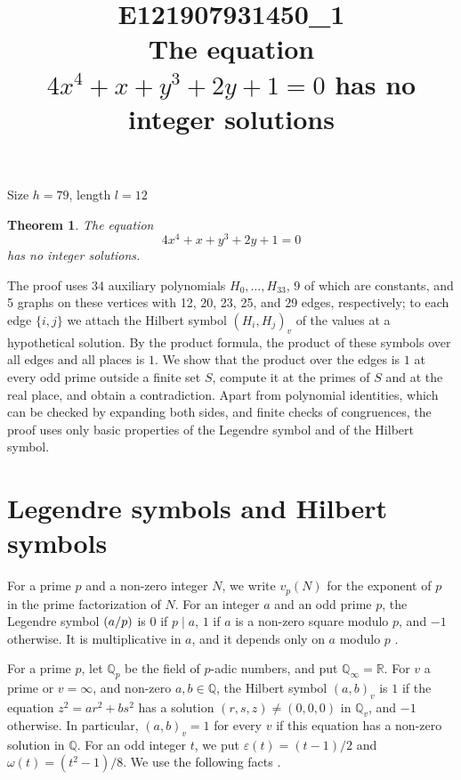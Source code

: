 \documentclass[11pt]{article}
\title{\textbf{E121907931450\_1}\\[4pt] {\Large The equation $4x^{4}+x+y^{3}+2y+1=0$ has no integer solutions}}
\author{}
\date{}
\newtheorem{theorem}{Theorem}
\newcommand{\Q}{\mathbb{Q}}
\newcommand{\leg}[2]{\mathchoice{\biggl(\dfrac{#1}{#2}\biggr)}{(#1/#2)}{(#1/#2)}{(#1/#2)}}
\begin{document}
\maketitle
\vspace{-8ex}
\begin{center}
Size $h=79$, length $l=12$
\end{center}

\begin{theorem}\label{thm:main}
The equation
\begin{equation}\label{eq:main}
4x^{4}+x+y^{3}+2y+1=0
\end{equation}
has no integer solutions.
\end{theorem}

The proof uses 34 auxiliary polynomials $H_0,\dots,H_{33}$, 9 of which are constants, and 5 graphs on these vertices with 12, 20, 23, 25, and 29 edges, respectively; to each edge $\{i,j\}$ we attach the Hilbert symbol $(H_i,H_j)_v$ of the values at a hypothetical solution. By the product formula, the product of these symbols over all edges and all places is $1$. We show that the product over the edges is $1$ at every odd prime outside a finite set $S$, compute it at the primes of $S$ and at the real place, and obtain a contradiction. Apart from polynomial identities, which can be checked by expanding both sides, and finite checks of congruences, the proof uses only basic properties of the Legendre symbol and of the Hilbert symbol.

\section{Legendre symbols and Hilbert symbols}

For a prime $p$ and a non-zero integer $N$, we write $v_p(N)$ for the exponent of $p$ in the prime factorization of $N$. For an integer $a$ and an odd prime $p$, the Legendre symbol $\leg{a}{p}$ is $0$ if $p\mid a$, $1$ if $a$ is a non-zero square modulo $p$, and $-1$ otherwise. It is multiplicative in $a$, and it depends only on $a$ modulo $p$ \cite[Chapter~5]{IR}.

For a prime $p$, let $\Q_p$ be the field of $p$-adic numbers, and put $\Q_\infty=\mathbb R$. For $v$ a prime or $v=\infty$, and non-zero $a,b\in\Q$, the Hilbert symbol $(a,b)_v$ is $1$ if the equation $z^2=ar^2+bs^2$ has a solution $(r,s,z)\neq(0,0,0)$ in $\Q_v$, and $-1$ otherwise. In particular, $(a,b)_v=1$ for every $v$ if this equation has a non-zero solution in $\Q$. For an odd integer $t$, we put $\varepsilon(t)=(t-1)/2$ and $\omega(t)=(t^2-1)/8$. We use the following facts \cite[Chapter~III, Proposition~2 and Theorems~1 and~3]{Se}.
\end{document}
